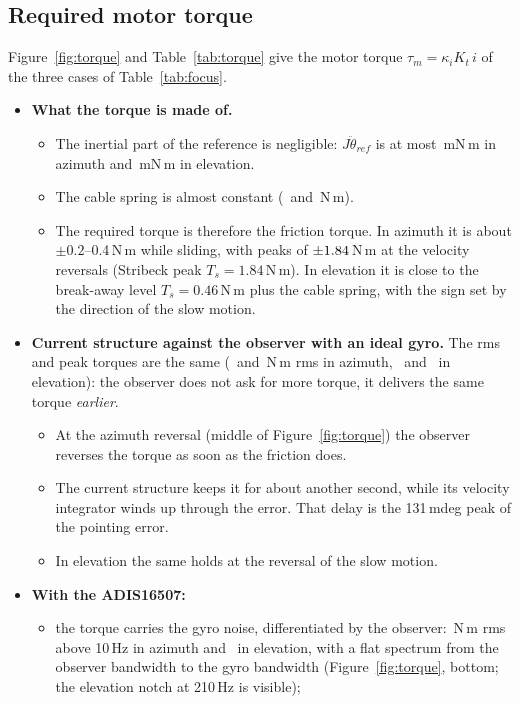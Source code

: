 \documentclass[10pt,a4paper]{article}
\numberwithin{equation}{section}
\begin{document}
\subsection{Required motor torque}\label{sec:torque}
Figure~\ref{fig:torque} and Table~\ref{tab:torque} give the motor torque $\tau_m=\kappa_iK_t\,i$ of the three cases of Table~\ref{tab:focus}.
\begin{itemize}
\item \textbf{What the torque is made of.}
  \begin{itemize}
  \item The inertial part of the reference is negligible: $J\ddot\theta_{ref}$ is at most \tauInertiaAz\,mN\,m in azimuth and \tauInertiaEl\,mN\,m in elevation.
  \item The cable spring is almost constant (\cableAz\ and \cableEl\,N\,m).
  \item The required torque is therefore the friction torque. In azimuth it is about $\pm0.2$--0.4\,N\,m while sliding, with peaks of $\pm1.84$\,N\,m at the velocity reversals (Stribeck peak $T_s=1.84$\,N\,m). In elevation it is close to the break-away level $T_s=0.46$\,N\,m plus the cable spring, with the sign set by the direction of the slow motion.
  \end{itemize}
\item \textbf{Current structure against the observer with an ideal gyro.} The rms and peak torques are the same (\tauRmsCurAz\ and \tauRmsIdealAz\,N\,m rms in azimuth, \tauRmsCurEl\ and \tauRmsIdealEl\ in elevation): the observer does not ask for more torque, it delivers the same torque \emph{earlier}.
  \begin{itemize}
  \item At the azimuth reversal (middle of Figure~\ref{fig:torque}) the observer reverses the torque as soon as the friction does.
  \item The current structure keeps it for about another second, while its velocity integrator winds up through the error. That delay is the 131\,mdeg peak of the pointing error.
  \item In elevation the same holds at the reversal of the slow motion.
  \end{itemize}
\item \textbf{With the ADIS16507:}
  \begin{itemize}
  \item the torque carries the gyro noise, differentiated by the observer: \tauHiDobAz\,N\,m rms above 10\,Hz in azimuth and \tauHiDobEl\ in elevation, with a flat spectrum from the observer bandwidth to the gyro bandwidth (Figure~\ref{fig:torque}, bottom; the elevation notch at 210\,Hz is visible);

\end{itemize}
\end{itemize}
\end{document}
